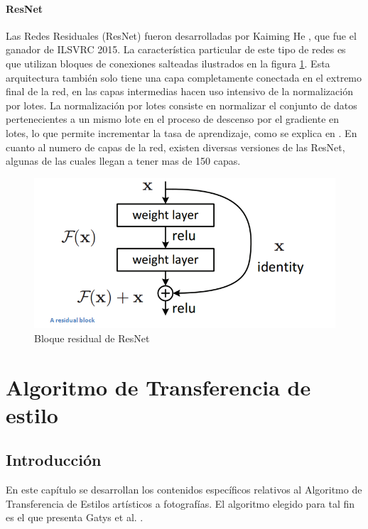 \documentclass[a4paper,11pt,spanish]{book}
\begin{document}
	\subsubsection{ResNet} \label{sec:resnet}
	  Las Redes Residuales (ResNet) fueron desarrolladas por Kaiming He \cite{Kaiming:ResNet}, que fue el ganador de ILSVRC 2015. La característica particular de este tipo de redes 
	  es que utilizan bloques de conexiones salteadas ilustrados en la figura \ref{fig:resnet}. 
	  Esta arquitectura también solo tiene una capa completamente conectada en el extremo final de la red, 
	  en las capas intermedias hacen uso intensivo de la normalización por lotes. La normalización por lotes consiste en normalizar el conjunto de datos pertenecientes
	  a un mismo lote en el proceso de descenso por el gradiente en lotes, lo que permite incrementar la tasa de aprendizaje, como se explica en \cite{BatchNormalization:Ioffe}.
	  En cuanto al numero de capas de la red, existen diversas versiones de las ResNet, algunas de las cuales llegan a tener mas de 150 capas.
	
	  \begin{figure}[h]
	    \begin{center}
	    \includegraphics[width=0.6\linewidth]{./img/resnet_block.png}
	    \end{center}
	    \caption{Bloque residual de ResNet}
	    \label{fig:resnet}
	  \end{figure}	

\chapter{Algoritmo de Transferencia de estilo} \label{chapter:style_transfer}
    \section{Introducción}
      En este capítulo se desarrollan los contenidos específicos relativos al Algoritmo de Transferencia de Estilos artísticos a fotografías. 
      El algoritmo elegido para tal fin es el que presenta Gatys et al. \cite{Gatys:Neural_Style}. 
      
\end{document}
